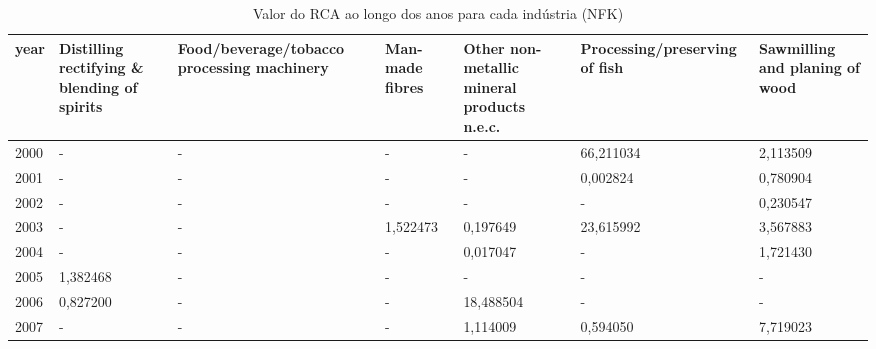 \begin{table}
\centering
\caption{Valor do RCA ao longo dos anos para cada indústria (NFK)}
\begin{tabular}{p{1cm}p{2cm}p{2cm}p{2cm}p{2cm}p{2cm}p{2cm}}
\toprule
 year &  Distilling rectifying \& blending of spirits &  Food/beverage/tobacco processing machinery &  Man-made fibres &  Other non-metallic mineral products n.e.c. &  Processing/preserving of fish &  Sawmilling and planing of wood \\
\midrule
 2000 &                                            - &                                           - &                - &                                           - &                      66,211034 &                        2,113509 \\
 2001 &                                            - &                                           - &                - &                                           - &                       0,002824 &                        0,780904 \\
 2002 &                                            - &                                           - &                - &                                           - &                              - &                        0,230547 \\
 2003 &                                            - &                                           - &         1,522473 &                                    0,197649 &                      23,615992 &                        3,567883 \\
 2004 &                                            - &                                           - &                - &                                    0,017047 &                              - &                        1,721430 \\
 2005 &                                     1,382468 &                                           - &                - &                                           - &                              - &                               - \\
 2006 &                                     0,827200 &                                           - &                - &                                   18,488504 &                              - &                               - \\
 2007 &                                            - &                                           - &                - &                                    1,114009 &                       0,594050 &                        7,719023 \\

\end{tabular}
\end{table}
